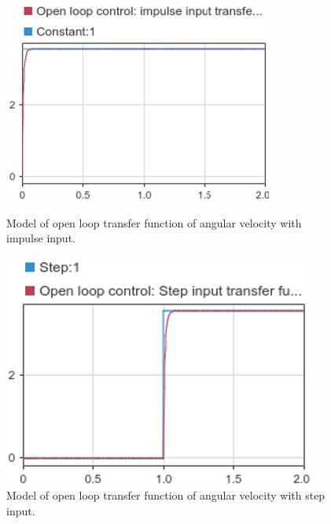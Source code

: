 \documentclass[conference]{IEEEtran}
\begin{document}
\begin{figure}[htbp]
    \centering
    \begin{minipage}[b]{0.24\textwidth}
      \includegraphics[width=\textwidth]{../img/q1-1.png}
      \caption{Model of open loop transfer function of angular velocity with impulse input.}
    \end{minipage}
    \hfill
    \begin{minipage}[b]{0.24\textwidth}
      \includegraphics[width=\textwidth]{../img/q1-3.png}
      \caption{Model of open loop transfer function of angular velocity with step input.}
    \end{minipage}
\end{figure}
\end{document}

